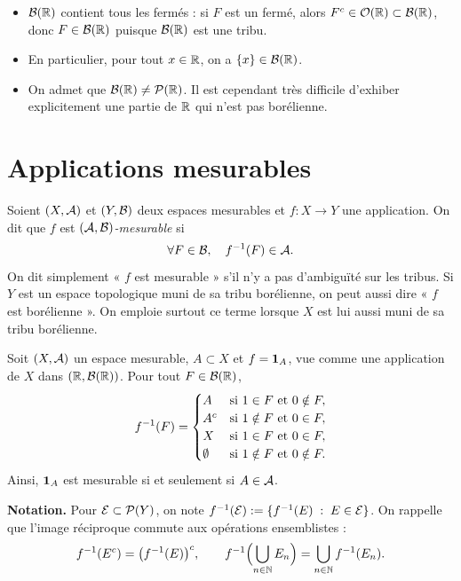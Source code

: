 \documentclass[11pt]{article}
\begin{document}
\begin{remarque}
\leavevmode
\begin{itemize}
  \item $\mathcal{B}(\mathbb{R})$ contient tous les fermés : si $F$ est un fermé, alors ${F}^{c} \in \mathcal{O}(\mathbb{R}) \subset \mathcal{B}(\mathbb{R})$, donc $F \in \mathcal{B}(\mathbb{R})$ puisque $\mathcal{B}(\mathbb{R})$ est une tribu.
  \item En particulier, pour tout $x \in \mathbb{R}$, on a $\{x\} \in \mathcal{B}(\mathbb{R})$.
  \item On admet que $\mathcal{B}(\mathbb{R}) \neq \mathcal{P}(\mathbb{R})$. Il est cependant très difficile d'exhiber explicitement une partie de $\mathbb{R}$ qui n'est pas borélienne.
\end{itemize}
\end{remarque}

\section{Applications mesurables}

\begin{definition}
Soient $(X,\mathcal{A})$ et $(Y,\mathcal{B})$ deux espaces mesurables et $f : X \to Y$ une application. On dit que $f$ est \emph{$(\mathcal{A},\mathcal{B})$-mesurable} si
\[
  \forall F \in \mathcal{B},\quad f^{-1}(F) \in \mathcal{A}.
\]
On dit simplement « $f$ est mesurable » s'il n'y a pas d'ambiguïté sur les tribus. Si $Y$ est un espace topologique muni de sa tribu borélienne, on peut aussi dire « $f$ est borélienne ». On emploie surtout ce terme lorsque $X$ est lui aussi muni de sa tribu borélienne.
\end{definition}

\begin{exemple}
Soit $(X,\mathcal{A})$ un espace mesurable, $A \subset X$ et $f = \mathbf{1}_A$, vue comme une application de $X$ dans $(\mathbb{R},\mathcal{B}(\mathbb{R}))$. Pour tout $F \in \mathcal{B}(\mathbb{R})$,
\[
  f^{-1}(F) =
  \begin{cases}
    A & \text{si } 1 \in F \text{ et } 0 \notin F,\\
    {A}^{c} & \text{si } 1 \notin F \text{ et } 0 \in F,\\
    X & \text{si } 1 \in F \text{ et } 0 \in F,\\
    \emptyset & \text{si } 1 \notin F \text{ et } 0 \notin F.
  \end{cases}
\]
Ainsi, $\mathbf{1}_A$ est mesurable si et seulement si $A \in \mathcal{A}$.
\end{exemple}

\textbf{Notation.} Pour $\mathcal{E} \subset \mathcal{P}(Y)$, on note $f^{-1}(\mathcal{E}) := \{f^{-1}(E) \;:\; E \in \mathcal{E}\}$. On rappelle que l'image réciproque commute aux opérations ensemblistes :
\[
  f^{-1}({E}^{c}) = \bigl(f^{-1}(E)\bigr)^{c},
  \qquad
  f^{-1}\Bigl(\bigcup_{n\in\mathbb{N}} E_n\Bigr) = \bigcup_{n\in\mathbb{N}} f^{-1}(E_n).
\]
\end{document}

